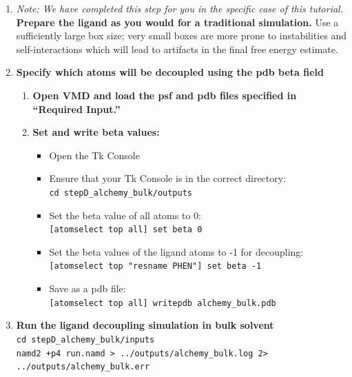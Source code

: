 \documentclass[9pt,tutorial]{Styling/livecoms}
\newcommand{\textInput}[1]{\texttt{#1}}
\begin{document}
    \begin{enumerate}
        \item \textit{Note: We have completed this step for you in the specific case of this tutorial.} \textbf{Prepare the ligand as you would for a traditional simulation.} Use a sufficiently large box size; very small boxes are more prone to instabilities and self-interactions which will lead to artifacts in the final free energy estimate. 
        \item \textbf{Specify which atoms will be decoupled using the pdb beta field}\label{step:makeFEPpdb} 
        \begin{enumerate}[label=\alph*., ref=\theenumi.\alph*]
            \item \textbf{Open VMD and load the psf and pdb files specified in ``Required Input.''}
            \item \textbf{Set and write beta values:}
            \begin{itemize}
                \item Open the Tk Console
                \item Ensure that your Tk Console is in the correct directory:\\
                \textInput{cd stepD\_alchemy\_bulk/outputs}
                \item Set the beta value of all atoms to 0:\\
                \textInput{[atomselect top all] set beta 0}
                \item Set the beta values of the ligand atoms to -1 for decoupling:\\
                \textInput{[atomselect top "resname PHEN"] set beta -1}
                \item Save as a pdb file:\\
                \textInput{[atomselect top all] writepdb alchemy\_bulk.pdb}
            \end{itemize}
        \end{enumerate}

        \item \textbf{Run the ligand decoupling simulation in bulk solvent}\\
        \textInput{cd stepD\_alchemy\_bulk/inputs}\\
        \textInput{namd2 +p4 run.namd > ../outputs/alchemy\_bulk.log 2> ../outputs/alchemy\_bulk.err}


\end{enumerate}
\end{document}

